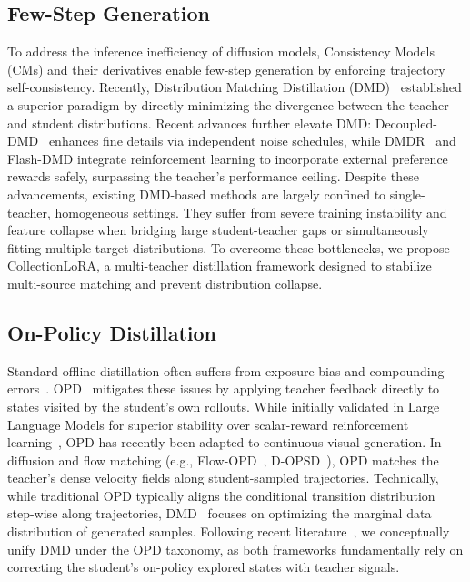 \documentclass{llmxive}
\begin{document}
\vspace{-0.3cm}
\subsection{Few-Step Generation}
To address the inference inefficiency of diffusion models, Consistency Models (CMs) \cite{song2023consistency} and their derivatives \cite{luo2023latent,wang2024phased,zhai2024motion} enable few-step generation by enforcing trajectory self-consistency. Recently, Distribution Matching Distillation (DMD)~\cite{dmd1,dmd2} established a superior paradigm by directly minimizing the divergence between the teacher and student distributions. Recent advances further elevate DMD: Decoupled-DMD~\cite{decoupledmd} enhances fine details via independent noise schedules, while DMDR~\cite{jiang2025distribution} and Flash-DMD\cite{chen2025flash} integrate reinforcement learning to incorporate external preference rewards safely, surpassing the teacher's performance ceiling.
Despite these advancements, existing DMD-based methods are largely confined to single-teacher, homogeneous settings. They suffer from severe training instability and feature collapse when bridging large student-teacher gaps or simultaneously fitting multiple target distributions. To overcome these bottlenecks, we propose CollectionLoRA, a multi-teacher distillation framework designed to stabilize multi-source matching and prevent distribution collapse.
\vspace{-0.3cm}
\subsection{On-Policy Distillation}
Standard offline distillation often suffers from exposure bias and compounding errors~\cite{llmopd}. OPD~\cite{llmopd,minillm,rethinkingopd} mitigates these issues by applying teacher feedback directly to states visited by the student’s own rollouts. While initially validated in Large Language Models for superior stability over scalar-reward reinforcement learning~\cite{rlopd}, OPD has recently been adapted to continuous visual generation. In diffusion and flow matching (e.g., Flow-OPD~\cite{fang2026flowopdonpolicydistillationflow}, D-OPSD~\cite{jiang2026dopsdonpolicyselfdistillationcontinuously}), OPD matches the teacher’s dense velocity fields along student-sampled trajectories.
Technically, while traditional OPD typically aligns the conditional transition distribution step-wise along trajectories, DMD~\cite{dmd2} focuses on optimizing the marginal data distribution of generated samples. Following recent literature~\cite{gu2026anyflowanystepvideodiffusion,chern2025livetalkrealtimemultimodalinteractive}, we conceptually unify DMD under the OPD taxonomy, as both frameworks fundamentally rely on correcting the student's on-policy explored states with teacher signals.
\end{document}
